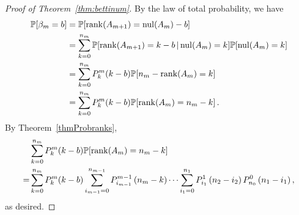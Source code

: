 
\begin{proof}[Proof of Theorem~\ref{thm:bettinum}]
  By the law of total probability, we have
  \begin{align*}
    \mathbb{P}[\beta_{m} = b] 
    &= \mathbb{P}[\operatorname{\mathrm{rank}}(A_{m+1}) = \mathrm{nul}(A_{m}) - b]\\
    &= \sum_{k=0}^{n_{m}}\mathbb{P}[\operatorname{\mathrm{rank}}(A_{m+1}) = k - b\,|\, \mathrm{nul}(A_{m})=k] \mathbb{P}[\mathrm{nul}(A_{m}) = k]\\
    &= \sum_{k=0}^{n_{m}} P_{k}^{m}(k-b)\mathbb{P}[n_{m} - \operatorname{\mathrm{rank}}(A_{m}) = k]\\
    &= \sum_{k=0}^{n_{m}} P_{k}^{m}(k-b)\mathbb{P}[\operatorname{\mathrm{rank}}(A_{m}) = n_{m} - k] \, .
  \end{align*}
  By Theorem~\ref{thmProbranks},
  \begin{align*}
    & \sum_{k=0}^{n_{m}} P_{k}^{m}(k-b)\mathbb{P}[\operatorname{\mathrm{rank}}(A_{m}) = n_{m} - k] \\
    =& \sum_{k=0}^{n_{m}} P_{k}^{m}(k-b)\sum_{i_{m-1}=0}^{n_{m-1}} P_{i_{m-1}}^{m-1}\left(n_{m} -k\right)
    \cdots
    \sum_{i_1 = 0}^{n_1} P_{i_1}^1\left(n_2 - i_2\right) P_{n_0}^0 \left(n_1 - i_1\right), 
  \end{align*}
  as desired.
\end{proof}




